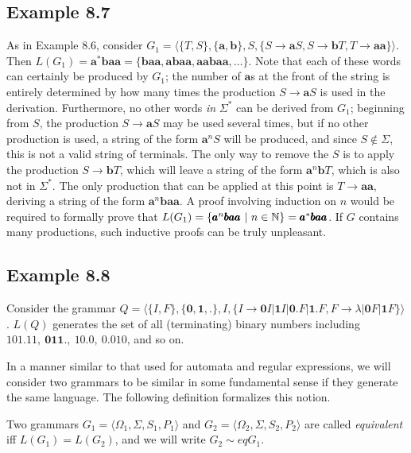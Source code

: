 \subsection*{Example 8.7}

As in Example 8.6, consider $G_1=\langle\{T,S\},\{\pmb{a},\pmb{b}\},S,\{S
\rightarrow\pmb{a}S,S\rightarrow\pmb{b}T,T\rightarrow\pmb{aa}\}\rangle$. Then
$L(G_1)=\pmb{a}^*\pmb{baa}=\{\pmb{baa},\pmb{abaa},\pmb{aabaa},\ldots\}$. Note that
each of these words can certainly be produced by $G_1$; the number of $\pmb{a}$s
at the front of the string is entirely determined by how many times the
production $S\rightarrow\pmb{a}S$ is used in the derivation. Furthermore, no
other words \emph{in} $\Sigma^*$ can be derived from $G_1$; beginning from $S$,
the production $S\rightarrow\pmb{a}S$ may be used several times, but if no other
production is used, a string of the form $\pmb{a}^nS$ will be produced, and
since $S\not \in\Sigma$, this is not a valid string of terminals. The only way to
remove the $S$ is to apply the production $S\rightarrow\pmb{b}T$, which will
leave a string of the form $\pmb{a}^n\pmb{b}T$, which is also not in $\Sigma^*$.
The only production that can be applied at this point is $T\rightarrow\pmb{aa}$,
deriving a string of the form $\pmb{a}^n\pmb{baa}$. A proof involving induction
on $n$ would be required to formally prove that $L(G_1)=\{\pmb{a}^n\pmb{baa}\ |\ n 
\in\mathbb{N}\}=\pmb{a}^*\pmb{baa}$. If $G$ contains many productions, such inductive
proofs can be truly unpleasant.

\subsection*{Example 8.8}

Consider the grammar $Q=\langle\{I,F\},\{\pmb{0},\pmb{1},\pmb{.}\},I,\{I
\rightarrow\pmb{0}I|\pmb{1}I|\pmb{0.}F|\pmb{1.}F,F\rightarrow\lambda|\pmb{0}F|
\pmb{1}F\}\rangle$. $L(Q)$ generates the set of all (terminating) binary numbers
including $\pmb{101.11},\ \pmb{011.},\ \pmb{10.0},\ \pmb{0.010}$, and so on.

In a manner similar to that used for automata and regular expressions, we will
consider two grammars to be similar in some fundamental sense if they generate
the same language. The following definition formalizes this notion.

\begin{dfn}\label{dfn-8.9}
Two grammars $G_1=\langle\Omega_1,\Sigma,S_1,P_1\rangle$ and $G_2=\langle\Omega_2,
\Sigma,S_2,P_2\rangle$ are called \emph{equivalent} iff $L(G_1)=L(G_2)$, and we will
write $G_2 \sim eq G_1$.
\end{dfn}

